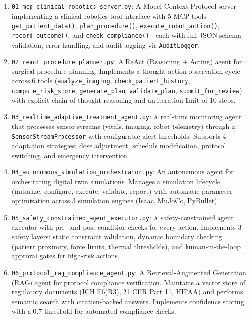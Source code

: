 \begin{enumerate}
  \item \texttt{01\_mcp\_clinical\_robotics\_server.py}: A Model Context Protocol server implementing a clinical robotics tool interface with 5 MCP tools---\texttt{get\_patient\_data()}, \texttt{plan\_procedure()}, \texttt{execute\_robot\_action()}, \texttt{record\_outcome()}, and \texttt{check\_compliance()}---each with full JSON schema validation, error handling, and audit logging via \texttt{AuditLogger}.

  \item \texttt{02\_react\_procedure\_planner.py}: A ReAct (Reasoning + Acting) agent for surgical procedure planning. Implements a thought-action-observation cycle across 6 tools (\texttt{analyze\_imaging}, \texttt{check\_patient\_history}, \texttt{compute\_risk\_score}, \texttt{generate\_plan}, \texttt{validate\_plan}, \texttt{submit\_for\_review}) with explicit chain-of-thought reasoning and an iteration limit of 10 steps.

  \item \texttt{03\_realtime\_adaptive\_treatment\_agent.py}: A real-time monitoring agent that processes sensor streams (vitals, imaging, robot telemetry) through a \texttt{SensorStreamProcessor} with configurable alert thresholds. Supports 4 adaptation strategies: dose adjustment, schedule modification, protocol switching, and emergency intervention.

  \item \texttt{04\_autonomous\_simulation\_orchestrator.py}: An autonomous agent for orchestrating digital twin simulations. Manages a simulation lifecycle (initialize, configure, execute, validate, report) with automatic parameter optimization across 3 simulation engines (Isaac, MuJoCo, PyBullet).

  \item \texttt{05\_safety\_constrained\_agent\_executor.py}: A safety-constrained agent executor with pre- and post-condition checks for every action. Implements 3 safety layers: static constraint validation, dynamic boundary checking (patient proximity, force limits, thermal thresholds), and human-in-the-loop approval gates for high-risk actions.

  \item \texttt{06\_protocol\_rag\_compliance\_agent.py}: A Retrieval-Augmented Generation (RAG) agent for protocol compliance verification. Maintains a vector store of regulatory documents (ICH E6(R3), 21 CFR Part 11, HIPAA) and performs semantic search with citation-backed answers. Implements confidence scoring with a 0.7 threshold for automated compliance checks.
\end{enumerate}

